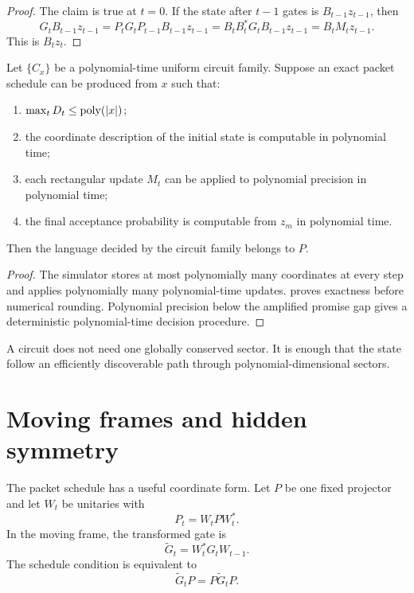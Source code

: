 \begin{proof}
The claim is true at $t=0$. If the state after $t-1$ gates is $B_{t-1}z_{t-1}$, then
\[
G_tB_{t-1}z_{t-1}
=P_tG_tP_{t-1}B_{t-1}z_{t-1}
=B_tB_t^*G_tB_{t-1}z_{t-1}
=B_tM_tz_{t-1}.
\]
This is $B_tz_t$.
\end{proof}

\begin{theorem}
\label{thm:moving-packet-collapse}
Let $\{C_x\}$ be a polynomial-time uniform circuit family. Suppose an exact packet schedule can be produced from $x$ such that:
\begin{enumerate}
\item $\max_tD_t\le\operatorname{poly}(|x|)$;
\item the coordinate description of the initial state is computable in polynomial time;
\item each rectangular update $M_t$ can be applied to polynomial precision in polynomial time;
\item the final acceptance probability is computable from $z_m$ in polynomial time.
\end{enumerate}
Then the language decided by the circuit family belongs to $P$.
\end{theorem}

\begin{proof}
The simulator stores at most polynomially many coordinates at every step and applies polynomially many polynomial-time updates.  proves exactness before numerical rounding. Polynomial precision below the amplified promise gap gives a deterministic polynomial-time decision procedure.
\end{proof}

\begin{derivedbox}
A circuit does not need one globally conserved sector. It is enough that the state follow an efficiently discoverable path through polynomial-dimensional sectors.
\end{derivedbox}

\section{Moving frames and hidden symmetry}
The packet schedule has a useful coordinate form. Let $P$ be one fixed projector and let $W_t$ be unitaries with
\[
P_t=W_tPW_t^*.
\]
In the moving frame, the transformed gate is
\begin{equation}
\widetilde G_t
=W_t^*G_tW_{t-1}.
\label{eq:moving-frame-gate}
\end{equation}
The schedule condition is equivalent to
\[
\widetilde G_tP=P\widetilde G_tP.
\]

